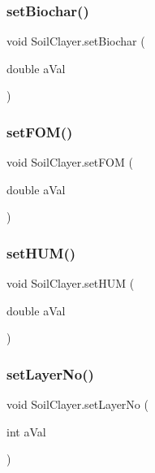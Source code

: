 \subsubsection{\texorpdfstring{setBiochar()}{setBiochar()}}
{\footnotesize\ttfamily void Soil\+Clayer.\+set\+Biochar (\begin{DoxyParamCaption}\item[{double}]{a\+Val }\end{DoxyParamCaption})\hspace{0.3cm}{\ttfamily [inline]}}

\mbox{\label{class_soil_clayer_a38b401bddeea29a506d613685d3fd9e7}} 
\subsubsection{\texorpdfstring{setFOM()}{setFOM()}}
{\footnotesize\ttfamily void Soil\+Clayer.\+set\+F\+OM (\begin{DoxyParamCaption}\item[{double}]{a\+Val }\end{DoxyParamCaption})\hspace{0.3cm}{\ttfamily [inline]}}

\mbox{\label{class_soil_clayer_a8bc3b2e41a50a85f8c4b98293acff103}} 
\subsubsection{\texorpdfstring{setHUM()}{setHUM()}}
{\footnotesize\ttfamily void Soil\+Clayer.\+set\+H\+UM (\begin{DoxyParamCaption}\item[{double}]{a\+Val }\end{DoxyParamCaption})\hspace{0.3cm}{\ttfamily [inline]}}

\mbox{\label{class_soil_clayer_ad32a0095b99de4d49a69f8e1a67c680f}} 
\subsubsection{\texorpdfstring{setLayerNo()}{setLayerNo()}}
{\footnotesize\ttfamily void Soil\+Clayer.\+set\+Layer\+No (\begin{DoxyParamCaption}\item[{int}]{a\+Val }\end{DoxyParamCaption})\hspace{0.3cm}{\ttfamily [inline]}}

